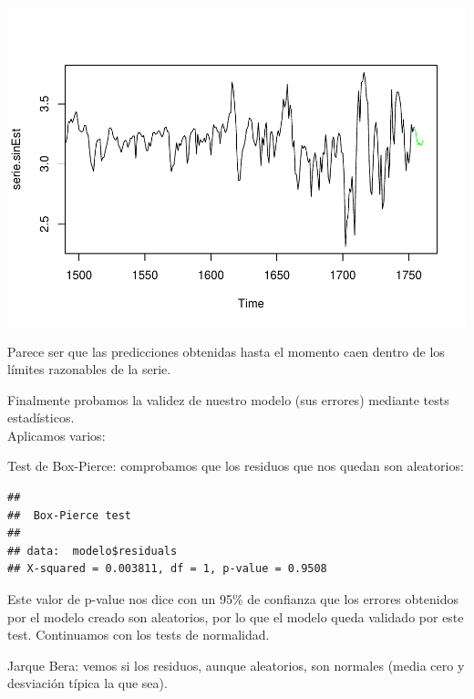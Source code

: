 \documentclass[]{article}
\newenvironment{Shaded}{\begin{snugshade}}{\end{snugshade}}
\newcommand{\KeywordTok}[1]{\textcolor[rgb]{0.13,0.29,0.53}{\textbf{#1}}}
\newcommand{\OperatorTok}[1]{\textcolor[rgb]{0.81,0.36,0.00}{\textbf{#1}}}
\newcommand{\NormalTok}[1]{#1}
\begin{document}
\includegraphics{timeSeries_files/figure-latex/unnamed-chunk-61-1.pdf}

Parece ser que las predicciones obtenidas hasta el momento caen dentro
de los límites razonables de la serie.

Finalmente probamos la validez de nuestro modelo (sus errores) mediante
tests estadísticos.\\
Aplicamos varios:

Test de Box-Pierce: comprobamos que los residuos que nos quedan son
aleatorios:

\begin{Shaded}
\end{Shaded}

\begin{verbatim}
## 
##  Box-Pierce test
## 
## data:  modelo$residuals
## X-squared = 0.003811, df = 1, p-value = 0.9508
\end{verbatim}

Este valor de p-value nos dice con un 95\% de confianza que los errores
obtenidos por el modelo creado son aleatorios, por lo que el modelo
queda validado por este test. Continuamos con los tests de normalidad.

Jarque Bera: vemos si los residuos, aunque aleatorios, son normales
(media cero y desviación típica la que sea).

\begin{Shaded}
\end{Shaded}
\end{document}

